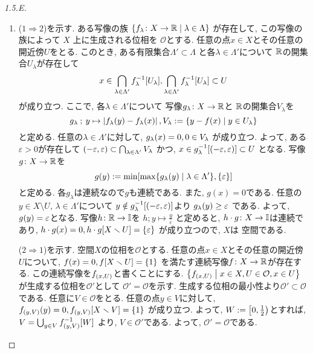 \documentclass[uplatex, dvipdfmx, a4paper, 12pt, class=jsarticle, crop=false]{standalone}
\begin{document}
\renewcommand{\labelenumi}{(\alph{enumi})}
\begin{proof}[1.5.E]\label{eng-1-5-E-proof}
	\begin{enumerate}
		\item (\( 1 \Longrightarrow 2\))を示す.
		ある写像の族
		\( \setcomp{\morph{f_\lambda}{X}{\R}}
		{\lambda \in \Lambda} \)
		が存在して, この写像の族によって
		\( X \) 上に生成される位相を
		\( \mathcal{O} \)とする.
		任意の点\( x \in X \)とその任意の開近傍\( U \)をとる.
		このとき, ある有限集合\( \Lambda' \subset \Lambda \)
		と各\( \lambda \in \Lambda' \)について
		\( \mathbb{R} \)の開集合\( U_\lambda \)が存在して
		\[ x \in \bigcap_{\lambda \in \Lambda'}
		\mapinvset{f_\lambda}{U_\lambda},
		\bigcap_{\lambda \in \Lambda'}
		\mapinvset{f_\lambda}{U_\lambda} \subset U \]
		が成り立つ.
		ここで, 各\( \lambda \in \Lambda' \)について
		写像\( g_\lambda\colon X\to\mathbb{R} \)と
		\( \mathbb{R} \)の開集合\( V_\lambda \)を
		\[ g_\lambda \semicolon y \mapsto
		\abs{\mappt{f_\lambda}{y} - \mappt{f_\lambda}{x}},
		V_\lambda \defeq \setcomp{y - f(x)}
		{y \in U_\lambda} \]
		と定める.
		任意の\( \lambda \in \Lambda' \)に対して,
		\( \mappt{g_\lambda}{x} = 0, 0 \in  V_\lambda \)
		が成り立つ.
		よって, ある\( \varepsilon > 0 \)が存在して
		\( \left( -\varepsilon , \varepsilon \right)
		\subset \bigcap_{\lambda \in \Lambda'} V_\lambda\)
		かつ,
		\( x \in \mapinvset{g_\lambda}
		{\intoo{-\varepsilon}{\varepsilon}} \subset U\)
		となる.
		写像\( g\colon X\to\mathbb{R} \)を
		\[ g(y) \defeq \min \lrbrack{
		\max \setcomp{\mappt{g_\lambda}{y}}{\lambda \in \Lambda'},
		\lrbrace{\varepsilon}} \]
		と定める.
		各\( g_\lambda \)は連続なので\( g \)も連続である.
		また, \( g(x) = 0 \)である.
		任意の\( y \in X \setminus U \), \( \lambda \in \Lambda'\)について
		\( y \notin \mapinvset{g_\lambda}
		{\intoo{-\varepsilon}{\varepsilon}} \)より
		\( \mappt{g_\lambda}{y} \geq \varepsilon \)
		である. よって, \( \mappt{g}{y} = \varepsilon \)となる.
		写像\( h\colon\mathbb{R}\to\mathbb{I} \)を
		\( h \semicolon y \mapsto \frac{y}{\varepsilon} \)
		と定めると, \( h \cdot g\colon X\to\mathbb{I} \)は連続であり,
		\( \mappt{h \compo g}{x} = 0,
		\mapset{h \compo g}{X \setminus U} = \lrbrace{\varepsilon} \)
		が成り立つので, \( X \)は  空間である.

		(\( 2 \Longrightarrow 1 \))を示す.
		 空間\( X \)の位相を\( \mathcal{O} \)とする.
		任意の点\( x \in X \)とその任意の開近傍\( U \)について,
		\( \mappt{f}{x} = 0, \mapset{f}{X \setminus U} = \lrbrace{1} \)
		を満たす連続写像\( f\colon X\to\mathbb{R} \)が存在する.
		この連続写像を\( f_{\lrparen{x,U}} \)と書くことにする.
		\( \setcomp{f_{\lrparen{x,U}}}{x \in X, U \in \mathcal{O}, x \in U} \)
		が生成する位相を\( \mathcal{O}' \)として
		\( \mathcal{O}' = \mathcal{O} \)を示す.
		生成する位相の最小性より\( \mathcal{O}' \subset \mathcal{O} \)である.
		任意に\( V \in \mathcal{O} \)をとる.
		任意の点\( y \in V \)に対して,
		\( \mappt{f_{\lrparen{y, V}}}{y} = 0,
		\mapset{f_{\lrparen{y, V}}}{X \setminus V} = \lrbrace{1} \)
		が成り立つ.
		よって, \( W \mathrel{:=} \left[ 0 , \frac{1}{2} \right) \)とすれば,
		\( V = \bigcup_{y \in V} \mapinvset{f_{\lrparen{y,V}}}{W} \)
		より, \( V \in \mathcal{O}' \)である.
		よって, \( \mathcal{O}' = \mathcal{O} \)である.


\end{enumerate}
\end{proof}
\end{document}
